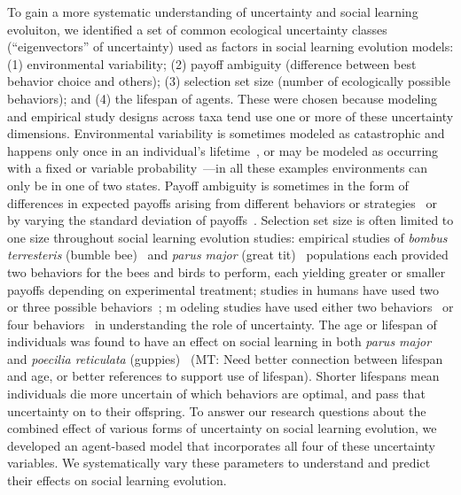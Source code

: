 \documentclass[letterpaper,11.5pt]{scrartcl}
\newcommand{\mt}[1]{{\textcolor{myorange} {({\tiny MT:} #1)}}}
\begin{document}
To gain a more systematic understanding of uncertainty and social learning evoluiton,
we identified a set of common ecological
uncertainty classes (``eigenvectors'' of uncertainty) used as factors
in social learning evolution models: (1) environmental variability; (2) payoff
ambiguity (difference between best behavior choice and others); (3) 
selection set size (number of ecologically possible behaviors); and 
(4) the lifespan of agents. These were chosen because modeling and empirical 
study designs across taxa tend use one or more of these uncertainty dimensions.
Environmental variability is sometimes modeled as catastrophic and 
happens only once in an individual's lifetime~\cite{Rogers1988}, or may be
modeled as occurring with a fixed or variable
probability~\cite{Feldman1996,McElreath2005}---in all these examples environments
can only be in one of two states. Payoff ambiguity is sometimes in the form
of differences in expected payoffs arising from different
behaviors or strategies~\cite{Enquist2007,Rendell2010}
or by varying the standard deviation of payoffs~\cite{McElreath2005}. 
Selection set size is often limited to one size throughout social learning
evolution studies: empirical studies of \emph{bombus terresteris} (bumble
bee)~\cite{Baracchi2018} and \emph{parus major} (great tit)~\cite{Aplin2017}
populations each provided two behaviors for
the bees and birds to perform, each yielding greater or smaller
payoffs depending on experimental treatment; studies in humans have used two
or three possible behaviors~\cite{McElreath2005,Toyokawa2019}; m
odeling studies have used either two 
behaviors~\cite{Feldman1996,Rendell2010} or four behaviors~\cite{Enquist2007} 
in understanding the role of uncertainty. The age or lifespan of individuals was
found to have an effect on social learning in both \emph{parus
major}~\cite{Aplin2017} and \emph{poecilia reticulata} 
(guppies)~\cite{Leris2016} \mt{Need better connection between lifespan and 
age, or better references to support use of lifespan}.
Shorter lifespans mean individuals
die more uncertain of which behaviors are optimal, and pass that uncertainty on
to their offspring. To answer our research questions about the combined effect
of various forms of uncertainty on social learning evolution, we developed an
agent-based model that incorporates all four of
these uncertainty variables. We systematically vary these parameters
to understand and predict their effects on social learning evolution.
\end{document}

